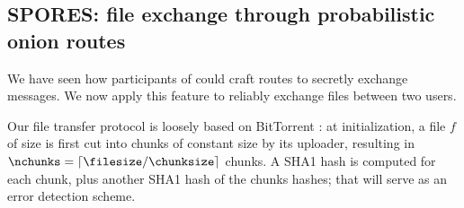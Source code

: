 






\subsection{SPORES: file exchange through probabilistic onion routes}
\label{ssec:spores_file_exchange_through_probabilistic_onion_routes}


We have seen how participants of \name could craft routes to secretly exchange messages.
We now apply this feature to reliably exchange files between two users.

Our file transfer protocol is loosely based on BitTorrent \cite{bt_bep3}: 
at initialization, a file $f$ of size \filesize is first cut into chunks of constant size \chunksize by its uploader,
resulting in $\nchunks = \lceil \filesize / \chunksize \rceil$ chunks.
A SHA1 hash \hashchunk is computed for each chunk, plus another SHA1 hash \hashfile of the chunks hashes; that will serve as an error detection scheme. 

